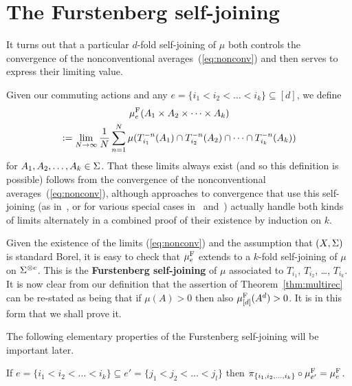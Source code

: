 \documentclass[12pt]{article}
\begin{document}
\section{The Furstenberg self-joining}

It turns out that a particular $d$-fold self-joining of $\mu$ both
controls the convergence of the nonconventional
averages~(\ref{eq:nonconv}) and then serves to express their
limiting value.

Given our commuting actions and any $e = \{i_1 < i_2 < \ldots <
i_k\}\subseteq [d]$, we define
\begin{multline*}
\mu^{\rm{F}}_e(A_1\times A_2\times \cdots\times A_k)\\
:= \lim_{N\to
\infty}\frac{1}{N}\sum_{n=1}^N\mu(T_{i_1}^{-n}(A_1)\cap
T_{i_2}^{-n}(A_2)\cap\cdots\cap T_{i_k}^{-n}(A_k))
\end{multline*}
for $A_1,A_2,\ldots,A_k \in \S$.  That these limits always exist
(and so this definition is possible) follows from the convergence of
the nonconventional averages~(\ref{eq:nonconv}), although approaches
to convergence that use this self-joining (as
in~\cite{Aus--nonconv}, or for various special cases in~\cite{Zha96}
and~\cite{Zie07}) actually handle both kinds of limits alternately
in a combined proof of their existence by induction on $k$.

Given the existence of the limits (\ref{eq:nonconv}) and the
assumption that $(X,\S)$ is standard Borel, it is easy to check that
$\mu^{\rm{F}}_e$ extends to a $k$-fold self-joining of $\mu$ on
$\S^{\otimes e}$. This is the \textbf{Furstenberg self-joining} of
$\mu$ associated to $T_{i_1}$, $T_{i_2}$, \ldots, $T_{i_k}$. It is
now clear from our definition that the assertion of
Theorem~\ref{thm:multirec} can be re-stated as being that if $\mu
(A)
> 0$ then also $\mu^{\rm{F}}_{[d]}(A^d) > 0$. It is in this form
that we shall prove it.

The following elementary properties of the Furstenberg self-joining
will be important later.

\begin{lem}\label{lem:Fberg-project}
If $e = \{i_1 < i_2 < \ldots < i_k\} \subseteq e' = \{j_1 < j_2 <
\ldots < j_l\}$ then
$\pi_{\{i_1,i_2,\ldots,i_k\}}\circ\mu^{\rm{F}}_{e'} =
\mu^{\rm{F}}_e$.
\end{lem}
\end{document}
